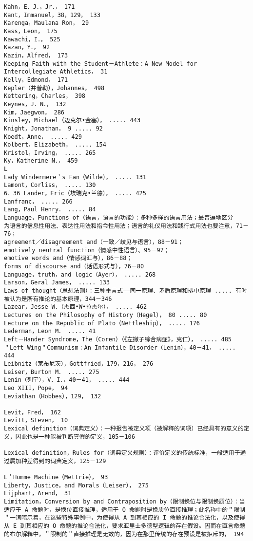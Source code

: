 \begin{verbatim}
Kahn，E．J．，Jr．， 171
Kant，Immanuel，38，129， 133
Karenga，Maulana Ron， 29
Kass，Leon， 175
Kawachi，I．， 525
Kazan，Y．， 92
Kazin，Alfred， 173
Keeping Faith with the Student－Athlete：A New Model for Intercollegiate Athletics， 31
Kelly，Edmond， 171
Kepler（并普勒），Johannes， 498
Kettering，Charles， 398
Keynes，J．N．， 132
Kim，Jaegwon， 286
Kinsley，Michael（迈克尔•金塞）， ..... 443
Knight，Jonathan， 9 ..... 92
Koedt，Anne， ..... 429
Kolbert，Elizabeth， ..... 154
Kristol，Irving， ..... 265
Ky，Katherine N．， 459
L
Lady Windermere＇s Fan（Wilde）， ..... 131
Lamont，Corliss， ..... 130
6．36 Lander，Eric（埃瑞克•兰德）， ..... 425
Lanfranc， ..... 266
Lang，Paul Henry． ..... 84
Language，Functions of（语言，语言的功能）：多种多样的语言用法；最普遍地区分
为语言的信息性用法、表达性用法和指令性用法；语言的礼仪用法和践行式用法也要注意，71－76；
agreement／disagreement and（一致／歧见与语言），88－91；
emotively neutral function（情感中性语言）、95－97；
emotive words and（情感词汇与），86－88；
forms of discourse and（话语形式与），76－80
Language，truth，and logic（Ayer）， ..... 268
Larson，Geral James， ..... 133
Laws of thought（思想法则）：三种重言式——同一原理、矛盾原理和排中原理 ..... 有时被认为是所有推论的基本原理，344－346
Lazear，Jesse W．（杰西•W•拉杰尔）， ..... 462
Lectures on the Philosophy of History（Hegel）， 80 ..... 80
Lecture on the Republic of Plato（Nettleship）， ..... 176
Lederman，Leon M． ..... 41
Left－Hander Syndrome，The（Coren）（《左撇子综合病症》，克仁）， ..... 485
＂Left Wing＂Communism：An Infantile Disorder（Lenin），40－41， ..... 444
Leibnitz（莱布尼茨），Gottfried，179，216， 276
Leiser，Burton M． ..... 275
Lenin（列宁），V．I．，40－41， ..... 444
Leo XIII，Pope， 94
Leviathan（Hobbes），129， 132

Levit，Fred， 162
Levitt，Steven， 10
Lexical definition（词典定义）：一种报告被定义项（被解释的词项）已经具有的意义的定义，因此也是一种能被判断真假的定义，105－106

Lexical definition，Rules for（词典定义规则）：评价定义的传统标准，一般适用于通过属加种差得到的词典定义，125－129

L＇Homme Machine（Mettrie）， 93
Liberty，Justice，and Morals（Leiser）， 275
Lijphart，Arend， 31
Limitation，Conversion by and Contraposition by（限制换位与限制换质位）：当适应于 A 命题时，是换位直接推理，适用于 O 命题时是换质位直接推理；此名称中的＂限制＂一词暗示着，在这些特殊事例中，为使得从 A 到其相应的 I 命题的推论合法化，以及使得从 E 到其相应的 O 命题的推论合法化，要求亚里士多德型逻辑的存在假设。因而在直言命题的布尔解释中，＂限制的＂直接推理是无效的，因为在那里传统的存在预设是被拒斥的， 194


\end{verbatim}
